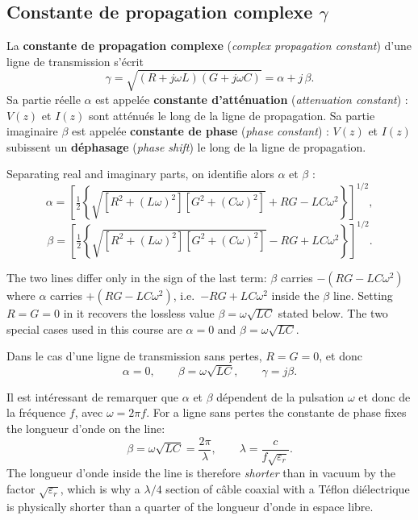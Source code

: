 \subsection{Constante de propagation complexe $\gamma$}
\begin{definition}
  La \textbf{constante de propagation complexe} (\textit{complex propagation
  constant}) d'une ligne de transmission s'écrit
  \[
    \gamma = \sqrt{(R+j\omega L)(G+j\omega C)} = \alpha + j\,\beta .
  \]
  Sa partie réelle $\alpha$ est appelée \textbf{constante d'atténuation}
  (\textit{attenuation constant}) : $V(z)$ et $I(z)$ sont atténués le long de
  la ligne de propagation. Sa partie imaginaire $\beta$ est appelée
  \textbf{constante de phase} (\textit{phase constant}) : $V(z)$ et $I(z)$
  subissent un \textbf{déphasage} (\textit{phase shift}) le long de la ligne de
  propagation.
\end{definition}

Separating real and imaginary parts, on identifie alors $\alpha$ et $\beta$ :
\[
  \alpha = \left[\tfrac{1}{2}\left\{
    \sqrt{\left[R^2 + (L\omega)^2\right]\left[G^2 + (C\omega)^2\right]}
    + RG - LC\omega^2 \right\}\right]^{1/2},
\]
\[
  \beta = \left[\tfrac{1}{2}\left\{
    \sqrt{\left[R^2 + (L\omega)^2\right]\left[G^2 + (C\omega)^2\right]}
    - RG + LC\omega^2 \right\}\right]^{1/2}.
\]

\begin{remark}
  The two lines differ only in the sign of the last term: $\beta$ carries
  $-(RG - LC\omega^2)$ where $\alpha$ carries $+(RG - LC\omega^2)$, i.e.\
  $-RG + LC\omega^2$ inside the $\beta$ line. Setting $R = G = 0$ in it
  recovers the lossless value $\beta = \omega\sqrt{LC}$ stated below. The two
  special cases used in this course are $\alpha = 0$ and
  $\beta = \omega\sqrt{LC}$.
\end{remark}

\begin{corollary}
  Dans le cas d'une ligne de transmission sans pertes, $R = G = 0$, et donc
  \[
    \alpha = 0, \qquad \beta = \omega\sqrt{LC}, \qquad \gamma = j\beta .
  \]
\end{corollary}

Il est intéressant de remarquer que $\alpha$ et $\beta$ dépendent de la
pulsation $\omega$ et donc de la fréquence $f$, avec $\omega = 2\pi f$. For a
ligne sans pertes the constante de phase fixes the longueur d'onde on the line:
\[
  \beta = \omega\sqrt{LC} = \frac{2\pi}{\lambda},
  \qquad \lambda = \frac{c}{f\sqrt{\varepsilon_r}} .
\]
The longueur d'onde inside the line is therefore \emph{shorter} than in vacuum
by the factor $\sqrt{\varepsilon_r}$, which is why a $\lambda/4$ section of
câble coaxial with a Téflon diélectrique is physically shorter than a quarter of
the longueur d'onde in espace libre.

